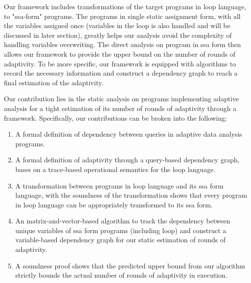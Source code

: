 Our framework includes transformations of the target programs in loop language,
to "ssa-form" programs. The programs in single static assignment form, with all the variables assigned once (variables in the loop is also handled and will be discussed in later section), greatly helps our analysis avoid the complexity of handling variables overwriting. The direct analysis on program in ssa form then allows our framework to provide the upper bound on the number of rounds of adaptivity.
To be more specific, our framework is equipped with algorithms to record the necessary information and construct a dependency graph to reach a final estimation of the adaptivity.

Our contribution lies in the static analysis on programs implementing adaptive analysis for a tight estimation of its number of rounds of adaptivity through a framework. Specifically, our contributions can be broken into the following:
\begin{enumerate}
    \item A formal definition of dependency between queries in adaptive data analysis programs.
    \item A formal definition of adaptivity through a query-based dependency graph, bases on a trace-based operational semantics for the loop language.
    \item A transformation between programs in loop language and its ssa form language, with the soundness of the transformation shows that every program in loop language can be appropriately transformed to its ssa form.
    \item An matrix-and-vector-based algorithm to track the dependency between unique variables of ssa form programs (including loop) and construct a variable-based dependency graph for our static estimation of rounds of adaptivity. 
    \item A soundness proof shows that the predicted upper bound from our algorithm strictly bounds the actual number of rounds of adaptivity in execution. 
\end{enumerate}



